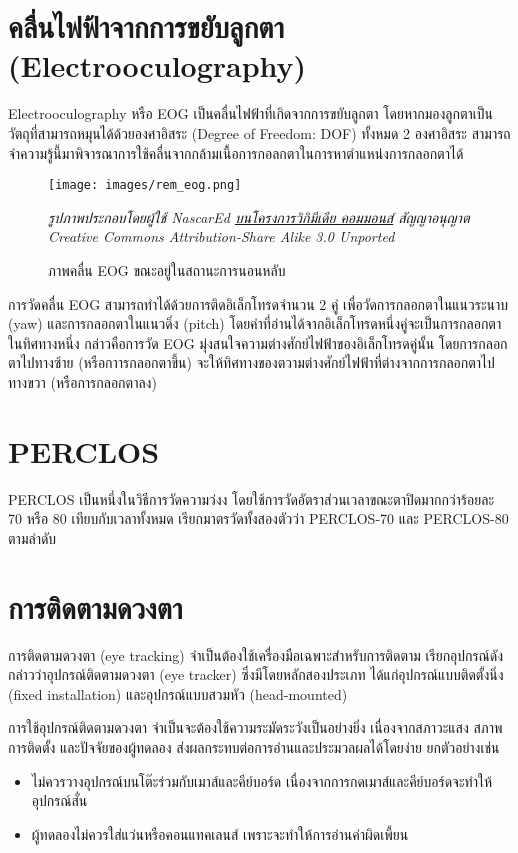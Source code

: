 \section{คลื่นไฟฟ้าจากการขยับลูกตา (Electrooculography)}
Electrooculography หรือ EOG เป็นคลื่นไฟฟ้าที่เกิดจากการขยับลูกตา โดยหากมองลูกตาเป็นวัตถุที่สามารถหมุนได้ด้วยองศาอิสระ (Degree of Freedom: DOF)
ทั้งหมด 2 องศาอิสระ สามารถจำความรู้นี้มาพิจารณาการใช้คลื่นจากกล้ามเนื้อการกอลกตาในการหาตำแหน่งการกลอกตาได้ \cite{bulling-eog}

\begin{figure}[h]
	\centering
	\texttt{[image: images/rem\_eog.png]}
	\caption{ภาพคลื่น EOG ขณะอยู่ในสถานะการนอนหลับ}
	\hspace{\linewidth}
	\textit{รูปภาพประกอบโดยผู้ใช้ NascarEd \href{https://commons.wikimedia.org/wiki/file:sleep\_stage\_rem.png}{บนโครงการวิกิมีเดีย คอมมอนส์}
		สัญญาอนุญาต Creative Commons Attribution-Share Alike 3.0 Unported}
\end{figure}

การวัดคลื่น EOG สามารถทำได้ด้วยการติดอิเล็กโทรดจำนวน 2 คู่ เพื่อวัดการกลอกตาในแนวระนาบ (yaw) และการกลอกตาในแนวดิ่ง (pitch)
โดยค่าที่อ่านได้จากอิเล็กโทรดหนึ่งคู่จะเป็นการกลอกตาในทิศทางหนึ่ง กล่าวคือการวัด EOG มุ่งสนใจความต่างศักย์ไฟฟ้าของอิเล็กโทรดคู่นั้น
โดยการกลอกตาไปทางซ้าย (หรือกาารกลอกตาขึ้น) จะให้ทิศทางของตวามต่างศักย์ไฟฟ้าที่ต่างจากการกลอกตาไปทางขวา (หรือการกลอกตาลง)

\section{PERCLOS}
PERCLOS \cite{perclos} เป็นหนึ่งในวิธีการวัดความว่งง โดยใช้การวัดอัตราส่วนเวลาขณะตาปิดมากกว่าร้อยละ 70 หรือ 80 เทียบกับเวลาทั้งหมด เรียกมาตรวัดทั้งสองตัวว่า PERCLOS-70 และ PERCLOS-80 ตามลำดับ

\section{การติดตามดวงตา}

การติดตามดวงตา (eye tracking) \cite{eyetrack} จำเป็นต้องใช้เครื่องมือเฉพาะสำหรับการติดตาม เรียกอุปกรณ์ดังกล่าวว่าอุปกรณ์ติดตามดวงตา (eye tracker) ซึ่งมีโดยหลักสองประเภท ได้แก่อุปกรณ์แบบติดตั้งนิ่ง (fixed installation) และอุปกรณ์แบบสวมหัว (head-mounted)

การใช้อุปกรณ์ติดตามดวงตา จำเป็นจะต้องใช้ความระมัดระวังเป็นอย่างยิ่ง เนื่องจากสภาวะแสง สภาพการติดตั้ง และปัจจัยของผู้ทดลอง ส่งผลกระทบต่อการอ่านและประมวลผลได้โดยง่าย ยกตัวอย่างเช่น

\begin{itemize}
	\item ไม่ควรวางอุปกรณ์บนโต๊ะร่วมกับเมาส์และคีย์บอร์ด เนื่องจากการกดเมาส์และคีย์บอร์ดจะทำให้อุปกรณ์สั่น
	\item ผู้ทดลองไม่ควรใส่แว่นหรือคอนแทคเลนส์ เพราะจะทำให้การอ่านค่าผิดเพี้ยน
\end{itemize}